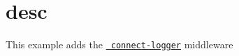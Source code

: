 \chapter{desc}
\hypertarget{md__d_1_2_g_i_t_2_food_link_2foodlink_8client_2node__modules_2bs-recipes_2recipes_2server_8middleware_2desc}{}\label{md__d_1_2_g_i_t_2_food_link_2foodlink_8client_2node__modules_2bs-recipes_2recipes_2server_8middleware_2desc}
This example adds the \href{https://www.npmjs.com/package/connect-logger}{\texttt{ connect-\/logger}} middleware

 